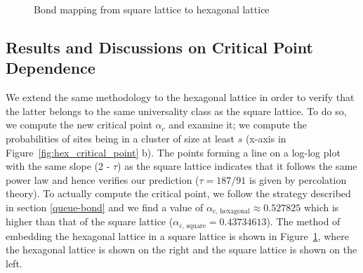 \documentclass[11pt]{article}
\begin{document}
\begin{figure}[H]
    \centering
    \caption{Bond mapping from square lattice to hexagonal lattice}
    \label{fig:sqrt2hex}
\end{figure}

\subsection{Results and Discussions on Critical Point Dependence}

We extend the same methodology to the hexagonal lattice in order to verify that the latter belongs to the same universality class as the square lattice. To do so, we compute the new critical point $\alpha_c$ and examine it; we compute the probabilities of sites being in a cluster of size at least $s$ (x-axis in Figure~\ref{fig:hex_critical_point} b). The points forming a line on a log-log plot with the same slope (2 - $\tau$) as the square lattice indicates that it follows the same power law and hence verifies our prediction ($\tau = 187/91$ is given by percolation theory). To actually compute the critical point, we follow the strategy described in section \ref{queue-bond} and we find a value of $\alpha_\text{c, hexagonal} \approx 0.527825$ which is higher than that of the square lattice ($\alpha_\text{c, square} = 0.43734613$). The method of embedding the hexagonal lattice in a square lattice is shown in Figure~\ref{fig:sqrt2hex}, where the hexagonal lattice is shown on the right and the square lattice is shown on the left.\\
\end{document}
